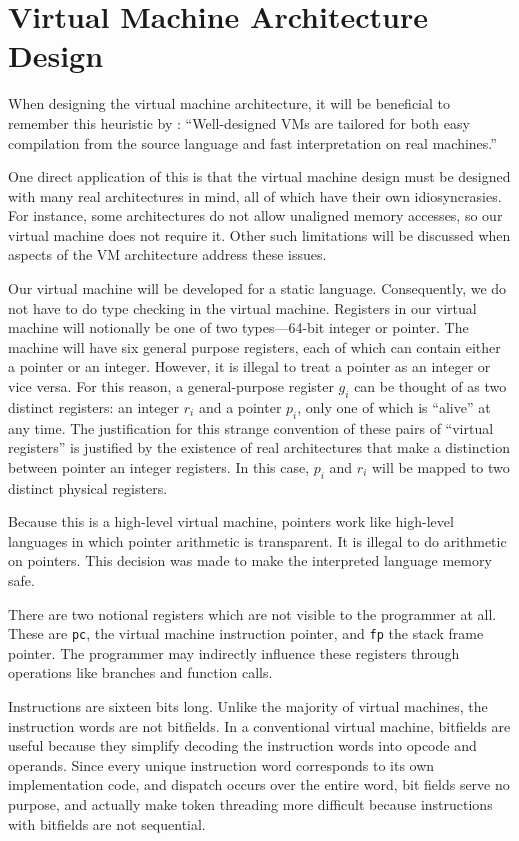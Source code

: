 	\section{Virtual Machine Architecture Design}
		When designing the virtual machine architecture, it will be beneficial to remember this heuristic by \cite{structureinterpreters}: ``Well-designed VMs are tailored for both easy compilation from the source language and fast interpretation on real machines.''
		
		One direct application of this is that the virtual machine design must be designed with many real architectures in mind, all of which have their own idiosyncrasies. For instance, some architectures do not allow unaligned memory accesses, so our virtual machine does not require it. Other such limitations will be discussed when aspects of the VM architecture address these issues.
		
		Our virtual machine will be developed for a static language. Consequently, we do not have to do type checking in the virtual machine. Registers in our virtual machine will notionally be one of two types---64-bit integer or pointer. The machine will have six general purpose registers, each of which can contain either a pointer or an integer. However, it is illegal to treat a pointer as an integer or vice versa. For this reason, a general-purpose register $g_i$ can be thought of as two distinct registers: an integer $r_i$ and a pointer $p_i$, only one of which is ``alive'' at any time. The justification for this strange convention of these pairs of ``virtual registers'' is justified by the existence of real architectures that make a distinction between pointer an integer registers. In this case, $p_i$ and $r_i$ will be mapped to two distinct physical registers.
		
		Because this is a high-level virtual machine, pointers work like high-level languages in which pointer arithmetic is transparent. It is illegal to do arithmetic on pointers. This decision was made to make the interpreted language memory safe.
		
		There are two notional registers which are not visible to the programmer at all. These are \texttt{pc}, the virtual machine instruction pointer, and \texttt{fp} the stack frame pointer. The programmer may indirectly influence these registers through operations like branches and function calls.
		
		Instructions are sixteen bits long. Unlike the majority of virtual machines, the instruction words are not bitfields. In a conventional virtual machine, bitfields are useful because they simplify decoding the instruction words into opcode and operands. Since every unique instruction word corresponds to its own implementation code, and dispatch occurs over the entire word, bit fields serve no purpose, and actually make token threading more difficult because instructions with bitfields are not sequential.
		
